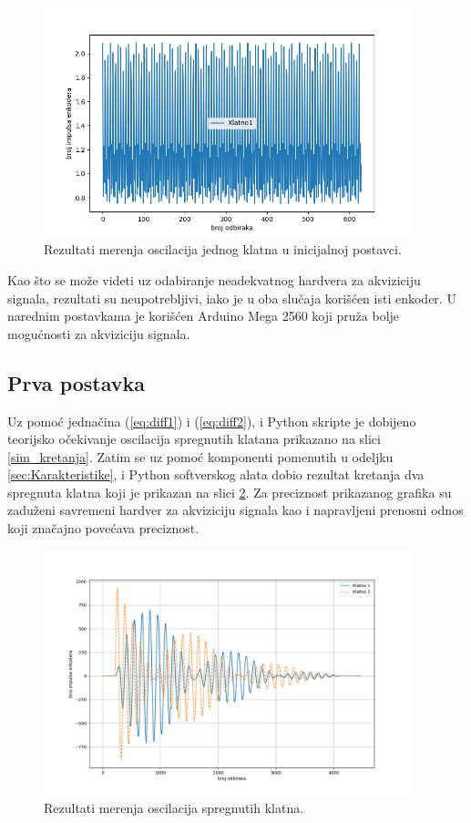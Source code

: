 \documentclass[a4paper, 12pt, diplomski]{etf}
\begin{document}
\begin{figure}[h!]
    \centering
    \includegraphics[width=0.95\textwidth]{py_rez/klatno_0.png}
    \caption{Rezultati merenja oscilacija jednog klatna u inicijalnoj postavci.}
    \label{rez0}
\end{figure}

\noindent
Kao što se može videti uz odabiranje neadekvatnog hardvera za akviziciju signala, rezultati su neupotrebljivi, iako je u oba slučaja korišćen isti enkoder. U narednim postavkama je korišćen Arduino Mega 2560 koji pruža bolje mogućnosti za akviziciju signala.


\subsection{Prva postavka}

Uz pomoć jednačina (\ref{eq:diff1}) i (\ref{eq:diff2}), i Python skripte je dobijeno teorijsko očekivanje oscilacija spregnutih klatana prikazano na slici \ref{sim_kretanja}. Zatim se uz pomoć komponenti pomenutih u odeljku \ref{sec:Karakteristike}, i Python softverskog alata dobio rezultat kretanja dva spregnuta klatna koji je prikazan na slici \ref{rez}. Za preciznost prikazanog grafika su zaduženi savremeni hardver za akviziciju signala kao i napravljeni prenosni odnos koji značajno povećava preciznost.


\begin{figure}[h!]
    \centering
    \includegraphics[width=0.95\textwidth]{py_rez/klatno.png}
    \caption{Rezultati merenja oscilacija spregnutih klatna.}
    \label{rez}
\end{figure}
\end{document}
